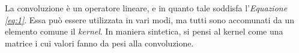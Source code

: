 \documentclass{subfiles}
\begin{document}
La convoluzione è un operatore lineare, e in quanto tale soddisfa l'\emph{Equazione \ref{eq:1}}.
Essa può essere utilizzata in vari modi, ma tutti sono accomunati da un elemento comune il \emph{kernel}.
In maniera sintetica, si pensi al kernel come una matrice i cui valori fanno da pesi alla convoluzione.
\end{document}
